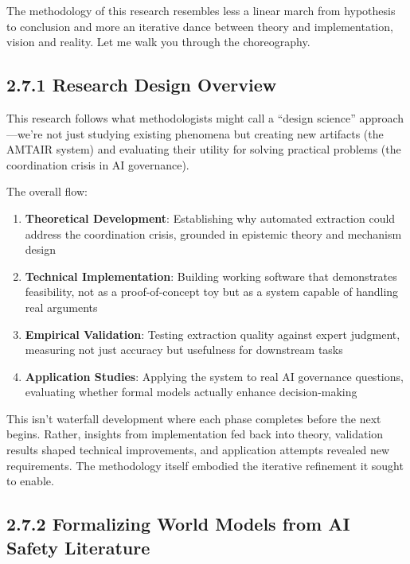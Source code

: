 \documentclass[
  11pt,
  letterpaper,
]{book}
\providecommand{\tightlist}{%
  \setlength{\itemsep}{0pt}\setlength{\parskip}{0pt}}
\begin{document}
The methodology of this research resembles less a linear march from
hypothesis to conclusion and more an iterative dance between theory and
implementation, vision and reality. Let me walk you through the
choreography.

\subsection{2.7.1 Research Design Overview}\label{sec-research-design}

This research follows what methodologists might call a ``design
science'' approach---we're not just studying existing phenomena but
creating new artifacts (the AMTAIR system) and evaluating their utility
for solving practical problems (the coordination crisis in AI
governance).

The overall flow:

\begin{enumerate}
\def\labelenumi{\arabic{enumi}.}
\tightlist
\item
  \textbf{Theoretical Development}: Establishing why automated
  extraction could address the coordination crisis, grounded in
  epistemic theory and mechanism design
\item
  \textbf{Technical Implementation}: Building working software that
  demonstrates feasibility, not as a proof-of-concept toy but as a
  system capable of handling real arguments
\item
  \textbf{Empirical Validation}: Testing extraction quality against
  expert judgment, measuring not just accuracy but usefulness for
  downstream tasks
\item
  \textbf{Application Studies}: Applying the system to real AI
  governance questions, evaluating whether formal models actually
  enhance decision-making
\end{enumerate}

This isn't waterfall development where each phase completes before the
next begins. Rather, insights from implementation fed back into theory,
validation results shaped technical improvements, and application
attempts revealed new requirements. The methodology itself embodied the
iterative refinement it sought to enable.

\subsection{2.7.2 Formalizing World Models from AI Safety
Literature}\label{sec-formalizing-world-models}
\end{document}

